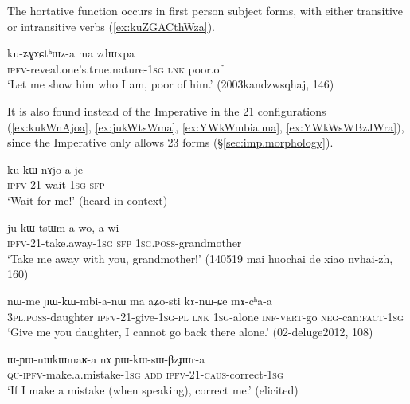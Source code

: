 The hortative function occurs in first person subject forms, with either transitive or intransitive verbs (\ref{ex:kuZGACthWza}).

\begin{exe}
\ex \label{ex:kuZGACthWza}
\gll ku-ʑɣɤɕtʰɯz-a ma zdɯxpa \\
\textsc{ipfv}-reveal.one's.true.nature-\textsc{1sg} \textsc{lnk} poor.of \\
\glt `Let me show him who I am, poor of him.' (2003kandzwsqhaj, 146)
\end{exe}

It is also found instead of the Imperative in the 2\fl{}1 configurations (\ref{ex:kukWnAjoa}, \ref{ex:jukWtsWma}, \ref{ex:YWkWmbia.ma}, \ref{ex:YWkWsWBzJWra}), since the Imperative only allows 2\fl{}3 forms (§\ref{sec:imp.morphology}).

\begin{exe}
	\ex \label{ex:kukWnAjoa}
	\gll ku-kɯ-nɤjo-a je \\
	\textsc{ipfv}-2\fl{}1-wait-\textsc{1sg} \textsc{sfp}  \\
	\glt `Wait for me!' (heard in context)
\end{exe}

\begin{exe}
\ex \label{ex:jukWtsWma}
\gll ju-kɯ-tsɯm-a wo, a-wi \\
\textsc{ipfv}-2\fl{}1-take.away-\textsc{1sg} \textsc{sfp} \textsc{1sg}.\textsc{poss}-grandmother \\
\glt `Take me away with you, grandmother!' (140519 mai huochai de xiao nvhai-zh, 160)
\end{exe}

\begin{exe}
\ex \label{ex:YWkWmbia.ma}
\gll  nɯ-me ɲɯ-kɯ-mbi-a-nɯ ma aʑo-sti kɤ-nɯ-ɕe mɤ-cʰa-a \\
\textsc{3pl}.\textsc{poss}-daughter \textsc{ipfv}-2\fl{}1-give-\textsc{1sg}-\textsc{pl} \textsc{lnk} \textsc{1sg}-alone \textsc{inf}-\textsc{vert}-go \textsc{neg}-can:\textsc{fact}-\textsc{1sg} \\
\glt `Give me you daughter, I cannot go back there alone.' (02-deluge2012, 108)
\end{exe}

\begin{exe}
\ex \label{ex:YWkWsWBzJWra}
\gll ɯ-ɲɯ-nɯkɯmaʁ-a nɤ ɲɯ-kɯ-sɯ-βzɟɯr-a \\
\textsc{qu}-\textsc{ipfv}-make.a.mistake-\textsc{1sg} \textsc{add} \textsc{ipfv}-2\fl{}1-\textsc{caus}-correct-\textsc{1sg} \\
\glt `If I make a mistake (when speaking), correct me.' (elicited)
\end{exe}

